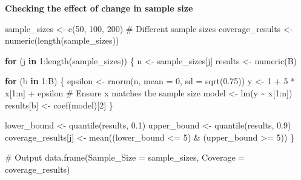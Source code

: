 \documentclass[
  11pt,
]{article}
\newenvironment{Shaded}{\begin{snugshade}}{\end{snugshade}}
\newcommand{\AttributeTok}[1]{\textcolor[rgb]{0.40,0.45,0.13}{#1}}
\newcommand{\CommentTok}[1]{\textcolor[rgb]{0.37,0.37,0.37}{#1}}
\newcommand{\ControlFlowTok}[1]{\textcolor[rgb]{0.00,0.23,0.31}{\textbf{#1}}}
\newcommand{\DecValTok}[1]{\textcolor[rgb]{0.68,0.00,0.00}{#1}}
\newcommand{\FloatTok}[1]{\textcolor[rgb]{0.68,0.00,0.00}{#1}}
\newcommand{\FunctionTok}[1]{\textcolor[rgb]{0.28,0.35,0.67}{#1}}
\newcommand{\NormalTok}[1]{\textcolor[rgb]{0.00,0.23,0.31}{#1}}
\newcommand{\OtherTok}[1]{\textcolor[rgb]{0.00,0.23,0.31}{#1}}
\newcommand{\SpecialCharTok}[1]{\textcolor[rgb]{0.37,0.37,0.37}{#1}}
\begin{document}
\textbf{Checking the effect of change in sample size}

\begin{Shaded}
\begin{Highlighting}[]
\NormalTok{sample\_sizes }\OtherTok{\textless{}{-}} \FunctionTok{c}\NormalTok{(}\DecValTok{50}\NormalTok{, }\DecValTok{100}\NormalTok{, }\DecValTok{200}\NormalTok{) }\CommentTok{\# Different sample sizes}
\NormalTok{coverage\_results }\OtherTok{\textless{}{-}} \FunctionTok{numeric}\NormalTok{(}\FunctionTok{length}\NormalTok{(sample\_sizes))}

\ControlFlowTok{for}\NormalTok{ (j }\ControlFlowTok{in} \DecValTok{1}\SpecialCharTok{:}\FunctionTok{length}\NormalTok{(sample\_sizes)) \{}
\NormalTok{  n }\OtherTok{\textless{}{-}}\NormalTok{ sample\_sizes[j]}
\NormalTok{  results }\OtherTok{\textless{}{-}} \FunctionTok{numeric}\NormalTok{(B)}
  
  \ControlFlowTok{for}\NormalTok{ (b }\ControlFlowTok{in} \DecValTok{1}\SpecialCharTok{:}\NormalTok{B) \{}
\NormalTok{    epsilon }\OtherTok{\textless{}{-}} \FunctionTok{rnorm}\NormalTok{(n, }\AttributeTok{mean =} \DecValTok{0}\NormalTok{, }\AttributeTok{sd =} \FunctionTok{sqrt}\NormalTok{(}\FloatTok{0.75}\NormalTok{))}
\NormalTok{    y }\OtherTok{\textless{}{-}} \DecValTok{1} \SpecialCharTok{+} \DecValTok{5} \SpecialCharTok{*}\NormalTok{ x[}\DecValTok{1}\SpecialCharTok{:}\NormalTok{n] }\SpecialCharTok{+}\NormalTok{ epsilon }\CommentTok{\# Ensure x matches the sample size}
\NormalTok{    model }\OtherTok{\textless{}{-}} \FunctionTok{lm}\NormalTok{(y }\SpecialCharTok{\textasciitilde{}}\NormalTok{ x[}\DecValTok{1}\SpecialCharTok{:}\NormalTok{n])}
\NormalTok{    results[b] }\OtherTok{\textless{}{-}} \FunctionTok{coef}\NormalTok{(model)[}\DecValTok{2}\NormalTok{]}
\NormalTok{  \}}
  
\NormalTok{  lower\_bound }\OtherTok{\textless{}{-}} \FunctionTok{quantile}\NormalTok{(results, }\FloatTok{0.1}\NormalTok{)}
\NormalTok{  upper\_bound }\OtherTok{\textless{}{-}} \FunctionTok{quantile}\NormalTok{(results, }\FloatTok{0.9}\NormalTok{)}
\NormalTok{  coverage\_results[j] }\OtherTok{\textless{}{-}} \FunctionTok{mean}\NormalTok{((lower\_bound }\SpecialCharTok{\textless{}=} \DecValTok{5}\NormalTok{) }\SpecialCharTok{\&}\NormalTok{ (upper\_bound }\SpecialCharTok{\textgreater{}=} \DecValTok{5}\NormalTok{))}
\NormalTok{\}}

\CommentTok{\# Output}
\FunctionTok{data.frame}\NormalTok{(}\AttributeTok{Sample\_Size =}\NormalTok{ sample\_sizes, }\AttributeTok{Coverage =}\NormalTok{ coverage\_results)}
\end{Highlighting}
\end{Shaded}
\end{document}
